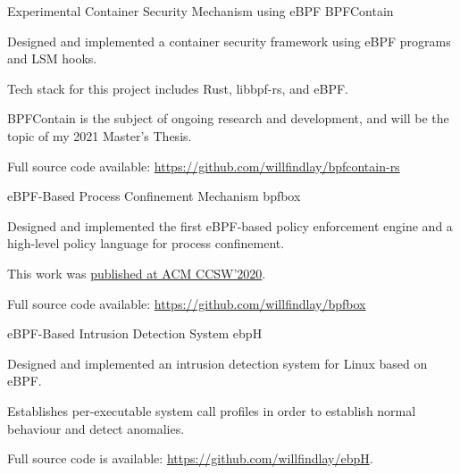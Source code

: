 


\begin{cventries}

  \cventry
    {Experimental Container Security Mechanism using eBPF} %
    {BPFContain} %
    {} %
    {} %
    {
      \begin{cvitems} %
        \item Designed and implemented a container security framework using eBPF programs and LSM hooks.
        \item Tech stack for this project includes Rust, libbpf-rs, and eBPF\@.
        \item BPFContain is the subject of ongoing research and development, and will be the topic of my 2021 Master's Thesis.
        \item Full source code available: \url{https://github.com/willfindlay/bpfcontain-rs}
      \end{cvitems}
    }

  \cventry
    {eBPF-Based Process Confinement Mechanism} %
    {bpfbox} %
    {} %
    {} %
    {
      \begin{cvitems} %
        \item Designed and implemented the first eBPF-based policy enforcement engine and a high-level policy language for process confinement.
        \item This work was \href{https://dl.acm.org/doi/10.1145/3411495.3421358}{published at ACM CCSW'2020}.
        \item Full source code available: \url{https://github.com/willfindlay/bpfbox}
      \end{cvitems}
    }

  \cventry
    {eBPF-Based Intrusion Detection System} %
    {ebpH} %
    {} %
    {} %
    {
      \begin{cvitems} %
        \item Designed and implemented an intrusion detection system for Linux based on eBPF.
        \item Establishes per-executable system call profiles in order to establish normal behaviour and detect anomalies.
        \item Full source code is available: \url{https://github.com/willfindlay/ebpH}.
      \end{cvitems}
    }


\end{cventries}
